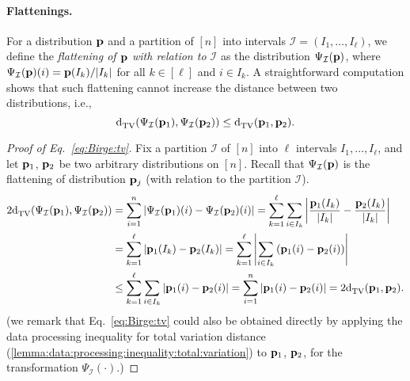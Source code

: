 \paragraph{Flattenings.}
\noindent For a distribution $\mathbf{p}$ and a partition of $[n]$ into intervals $\mathcal{I}=(I_1,\dots,I_\ell)$, we define the \emph{flattening of $\mathbf{p}$ with relation to $\mathcal{I}$} as the distribution $\Psi_{\mathcal{I}}(\mathbf{p})$, where $\Psi_{\mathcal{I}}(\mathbf{p})(i) = {\mathbf{p}(I_k)}/{\left\lvert I_k \right\rvert}$ for all $k\in [\ell]$ and $i\in I_k$. A straightforward computation shows that such flattening cannot increase the distance between two distributions, i.e.,
  \begin{equation}\label{eq:Birge:tv}
      {\operatorname{d}_{\textrm{TV}}^{}\!\left({ \Psi_{\mathcal{I}}(\ensuremath{\mathbf{p}}_1) ,  \Psi_{\mathcal{I}}(\ensuremath{\mathbf{p}}_2) }\right)} \leq {\operatorname{d}_{\textrm{TV}}^{}\!\left({\ensuremath{\mathbf{p}}_1, \ensuremath{\mathbf{p}}_2}\right)}.
  \end{equation}
\begin{proof}[Proof of Eq.~\eqref{eq:Birge:tv}]
    Fix a partition $\mathcal{I}$ of $[n]$ into $\ell$ intervals $I_1,\dots, I_\ell$, and let $\mathbf{p}_1$, $\mathbf{p}_2$ be two arbitrary distributions on $[n]$. Recall that $\Psi_{\mathcal{I}}(\mathbf{p})$ is the flattening of distribution $\mathbf{p}_j$ (with relation to the partition $\mathcal{I}$).
      \begin{align*}
      2{\operatorname{d}_{\textrm{TV}}^{}\!\left({ \Psi_{\mathcal{I}}(\mathbf{p}_1) ,  \Psi_{\mathcal{I}}(\mathbf{p}_2) }\right)} &= \sum_{i=1}^n \left\lvert  \Psi_{\mathcal{I}}(\mathbf{p}_1)(i) - \Psi_{\mathcal{I}}(\mathbf{p}_2)(i)  \right\rvert = \sum_{k=1}^\ell \sum_{i\in I_k} \left\lvert  \frac{\mathbf{p}_1(I_k)}{\left\lvert I_k \right\rvert} - \frac{\mathbf{p}_2(I_k)}{\left\lvert I_k \right\rvert}  \right\rvert \\
      &=  \sum_{k=1}^\ell \left\lvert  \mathbf{p}_1(I_k) - \mathbf{p}_2(I_k)  \right\rvert = \sum_{k=1}^\ell \left\lvert  \sum_{i\in I_k}\left( \mathbf{p}_1(i) - \mathbf{p}_2(i) \right)  \right\rvert \\
      &\leq  \sum_{k=1}^\ell \sum_{i\in I_k} \left\lvert  \mathbf{p}_1(i) - \mathbf{p}_2(i)   \right\rvert = \sum_{i=1}^n \left\lvert  \mathbf{p}_1(i) - \mathbf{p}_2(i)   \right\rvert 
      = 2{\operatorname{d}_{\textrm{TV}}^{}\!\left({\mathbf{p}_1, \mathbf{p}_2}\right)}.
      \end{align*}
(we remark that Eq.~\eqref{eq:Birge:tv} could also be obtained directly by applying the data processing inequality for total variation distance (\cref{lemma:data:processing:inequality:total:variation}) to $\mathbf{p}_1$, $\mathbf{p}_2$, for the transformation $\Psi_{\mathcal{I}}(\cdot)$.)
\end{proof}

